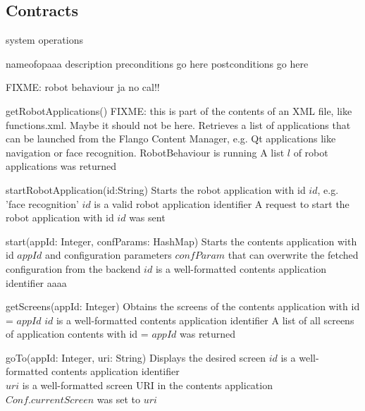 \subsection{Contracts}
system operations

\begin{sopcontract}{nameofopaaa}
{description}
{preconditions go here}
{postconditions go here}
\end{sopcontract}

FIXME: robot behaviour ja no cal!!

\begin{sopcontract}{getRobotApplications()}
{FIXME: this is part of the contents of an XML file, like functions.xml. Maybe it should not be here. Retrieves a list of applications that can be launched from the Flango Content Manager, e.g. Qt applications like navigation or face recognition.}
{RobotBehaviour is running}
{A list $l$ of robot applications was returned}
\end{sopcontract}

\begin{sopcontract}{startRobotApplication(id:String)}
{Starts the robot application with id $id$, e.g. 'face recognition'}
{$id$ is a valid robot application identifier}
{A request to start the robot application with id $id$ was sent}
\end{sopcontract}

\begin{sopcontract}{start(appId: Integer, confParams: HashMap)}
{Starts the contents  application with id $appId$ and configuration parameters $confParam$ that can overwrite the fetched configuration from the backend}
{$id$ is a well-formatted contents application identifier}
{aaaa}
\end{sopcontract}

\begin{sopcontract}{getScreens(appId: Integer)}
{Obtains the screens of the contents application with id = $appId$}
{$id$ is a well-formatted contents application identifier}
{A list of all screens of application contents with id = $appId$ was returned}
\end{sopcontract}

\begin{sopcontract}{goTo(appId: Integer, uri: String)}
{Displays the desired screen}
{$id$ is a well-formatted contents application identifier \\ $uri$ is a well-formatted screen \ac{URI} in the contents application}
{$Conf.currentScreen$ was set to $uri$}
\end{sopcontract}

